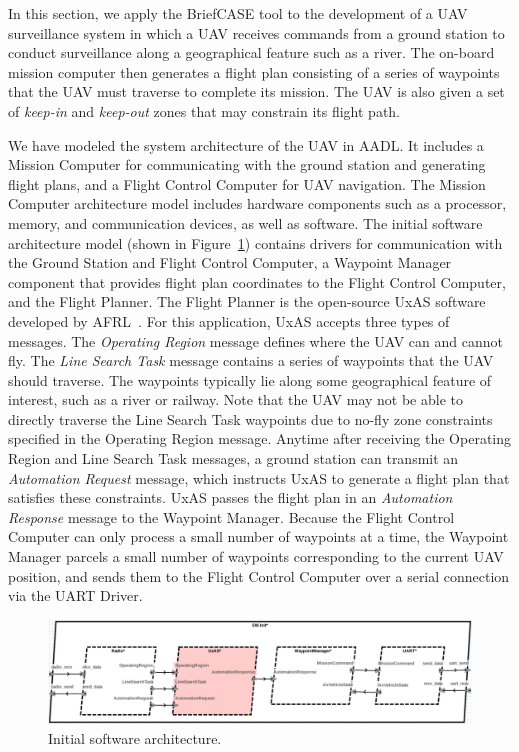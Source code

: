 In this section, we apply the BriefCASE tool to the development of a UAV surveillance system in which a UAV receives commands from a ground station to conduct surveillance along a geographical feature such as a river. The on-board mission computer then generates a flight plan consisting of a series of waypoints that the UAV must traverse to complete its mission. The UAV is also given a set of \textit{keep-in} and \textit{keep-out} zones that may constrain its flight path.

We have modeled the system architecture of the UAV in AADL.  It includes a Mission Computer for communicating with the ground station and generating flight plans, and a Flight Control Computer for UAV navigation.  The Mission Computer architecture model includes hardware components such as a processor, memory, and communication devices, as well as software.
%
The initial software architecture model (shown in Figure~\ref{fig:sw-initial}) contains drivers for communication with the Ground Station and Flight Control Computer, a Waypoint Manager component that provides flight plan coordinates to the Flight Control Computer, and the Flight Planner.  The Flight Planner is the open-source UxAS software developed by AFRL~\cite{uxas}. For this application, UxAS accepts three types of messages.  The \textit{Operating Region} message defines where the UAV can and cannot fly.  The \textit{Line Search Task} message contains a series of waypoints that the UAV should traverse.  The waypoints typically lie along some geographical feature of interest, such as a river or railway.  Note that the UAV may not be able to directly traverse the Line Search Task waypoints due to no-fly zone constraints specified in the Operating Region message.  Anytime after receiving the Operating Region and Line Search Task messages, a ground station can transmit an \textit{Automation Request} message, which instructs UxAS to generate a flight plan that satisfies these constraints.  UxAS passes the flight plan in an \textit{Automation Response} message to the Waypoint Manager.  Because the Flight Control Computer can only process a small number of waypoints at a time, the Waypoint Manager parcels a small number of waypoints corresponding to the current UAV position, and sends them to the Flight Control Computer over a serial connection via the UART Driver.

\begin{figure}[h]
	\centering
	\includegraphics[width=1\columnwidth]{figs/sw-initial.png}
	\caption{Initial software architecture.} 
	\label{fig:sw-initial} 
\end{figure}

